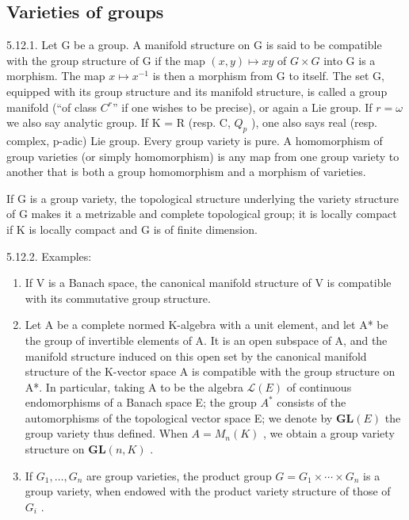 \subsection{Varieties of groups}

5.12.1. Let G be a group. A manifold structure on G is said to be compatible with the group structure of G if the map \((x, y) \mapsto xy\) of \(G \times G\) into G is a morphism. The map \(x \mapsto x^{-1}\) is then a morphism from G to itself. The set G, equipped with its group structure and its manifold structure, is called a group manifold (“of class \(C^{r}\)” if one wishes to be precise), or again a Lie group. If \(r = \omega\) we also say analytic group. If K = R (resp. C, \(Q_{p}\) ), one also says real (resp. complex, p-adic) Lie group. Every group variety is pure. A homomorphism of group varieties (or simply homomorphism) is any map from one group variety to another that is both a group homomorphism and a morphism of varieties.

If G is a group variety, the topological structure underlying the variety structure of G makes it a metrizable and complete topological group; it is locally compact if K is locally compact and G is of finite dimension.

5.12.2. Examples:

\begin{enumerate}
\def\labelenumi{(\roman{enumi})}
\item
  If V is a Banach space, the canonical manifold structure of V is compatible with its commutative group structure.
\item
  Let A be a complete normed K-algebra with a unit element, and let A* be the group of invertible elements of A. It is an open subspace of A, and the manifold structure induced on this open set by the canonical manifold structure of the K-vector space A is compatible with the group structure on A*. In particular, taking A to be the algebra \(\mathcal{L}(E)\) of continuous endomorphisms of a Banach space E; the group \(A^{*}\) consists of the automorphisms of the topological vector space E; we denote by \(\mathbf{GL}(E)\) the group variety thus defined. When \(A = M_{n}(K)\) , we obtain a group variety structure on \(\mathbf{GL}(n, K)\) .
\item
  If \(G_{1},\ldots,G_{n}\) are group varieties, the product group \(G=G_{1}\times\cdots\times G_{n}\) is a group variety, when endowed with the product variety structure of those of \(G_{i}\) .
\end{enumerate}

